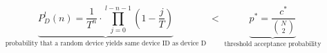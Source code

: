 \documentclass{standalone}
\begin{document}
\centering
\begin{minipage}{13cm}
	\[
		\underbrace{
			P_D^l(n)
			=
			\frac{1}{T^n}
			\cdot
			\prod_{j=0}^{l - n - 1}
			\left(1 - \frac{j}{T}\right)
		}_{\text{probability that a random device yields same device ID as device D}}
		\;<\;
		\underbrace{
			p^* = \frac{c^*}{\binom{N}{2}}
		}_{\text{threshold acceptance probability}}
	\]
\end{minipage}
\end{document}

